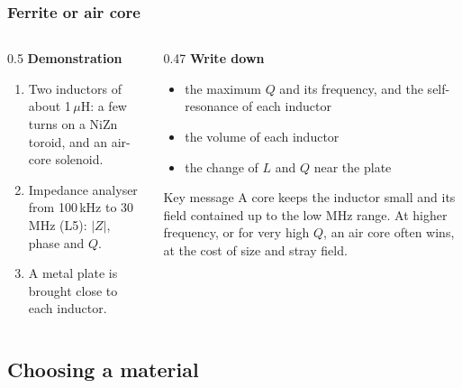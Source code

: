 \begin{frame}
	\frametitle{Ferrite or air core}
	\begin{columns}[T]
		\begin{column}{0.5\textwidth}
			\textbf{Demonstration}
			\begin{enumerate}
				\item Two inductors of about 1\,$\mu$H: a few turns on a NiZn toroid, and an air-core solenoid.
				\item Impedance analyser from 100\,kHz to 30\,MHz (L5): $|Z|$, phase and $Q$.
				\item A metal plate is brought close to each inductor.
			\end{enumerate}
		\end{column}
		\begin{column}{0.47\textwidth}
			\textbf{Write down}
			\begin{itemize}
				\item the maximum $Q$ and its frequency, and the self-resonance of each inductor
				\item the volume of each inductor
				\item the change of $L$ and $Q$ near the plate
			\end{itemize}
			\begin{block}{Key message}
				A core keeps the inductor small and its field contained up to the low MHz range. At higher frequency, or for very high $Q$, an air core often wins, at the cost of size and stray field.
			\end{block}
		\end{column}
	\end{columns}
\end{frame}

\subsection{Choosing a material}

